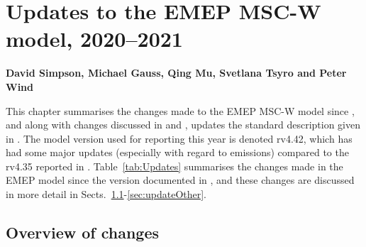 \chapter[Model updates]{Updates to the EMEP MSC-W model, 2020--2021}
\label{ch:ModelUpdates}


{\bf{David Simpson, Michael Gauss, Qing Mu, Svetlana Tsyro and Peter Wind}}
\vspace{30pt}


This chapter summarises the changes made to the EMEP MSC-W  model
since \citet{R2020:ModDev}, and along with changes discussed in
\citet{R2013:ModDev,R2015:ModDev,R2016:ModDev,R2017:ModDev,R2019:ModDev,R2020:ModDev} and
\citet{R2014:ModDev},
updates the standard description given in \citet{Simpson:EMEP2012}. The
model version used for reporting this year is denoted rv4.42, which has
had some major updates (especially with regard to emissions) compared to
the rv4.35 reported in \citet{R2020:ModDev}.
Table~\ref{tab:Updates} summarises
the changes made in the EMEP model since the version documented in
\citet{Simpson:EMEP2012}, and these changes are discussed in
more detail in Sects.~\ref{sec:updateOverview}-\ref{sec:updateOther}.

%

\section{Overview of changes} 
\label{sec:updateOverview}

